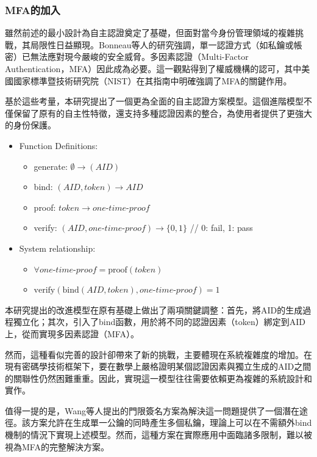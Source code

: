\subsubsection{MFA的加入}
雖然前述的最小設計為自主認證奠定了基礎，但面對當今身份管理領域的複雜挑戰，其局限性日益顯現。Bonneau等人\cite{bonneau2012mfa}的研究強調，單一認證方式（如私鑰或帳密）已無法應對現今嚴峻的安全威脅。多因素認證（Multi-Factor Authentication，MFA）因此成為必要。這一觀點得到了權威機構的認可，其中美國國家標準暨技術研究院（NIST）在其指南中明確強調了MFA的關鍵作用\cite{NIST800-63-3}。

基於這些考量，本研究提出了一個更為全面的自主認證方案模型。這個進階模型不僅保留了原有的自主性特徵，還支持多種認證因素的整合，為使用者提供了更強大的身份保護。
\begin{itemize}
  \item Function Definitions:
        \begin{itemize}
          \item generate: $\emptyset \rightarrow (AID)$
          \item bind: $(AID, token) \rightarrow AID$
          \item proof: $token \rightarrow one\text{-}time\text{-}proof$
          \item verify: $(AID, one\text{-}time\text{-}proof) \rightarrow \{0,1\}$ \hfill // 0: fail, 1: pass
        \end{itemize}
  \item System relationship:
        \begin{itemize}
          \item $\forall one\text{-}time\text{-}proof = \text{proof}(token)$
          \item $\text{verify}(\text{bind}(AID, token), one\text{-}time\text{-}proof) = 1$
        \end{itemize}
\end{itemize}
本研究提出的改進模型在原有基礎上做出了兩項關鍵調整：首先，將AID的生成過程獨立化；其次，引入了bind函數，用於將不同的認證因素（token）綁定到AID上，從而實現多因素認證（MFA）。

然而，這種看似完善的設計卻帶來了新的挑戰，主要體現在系統複雜度的增加。在現有密碼學技術框架下，要在數學上嚴格證明某個認證因素與獨立生成的AID之間的關聯性仍然困難重重。因此，實現這一模型往往需要依賴更為複雜的系統設計和實作。

值得一提的是，Wang等人\cite{Wang2013ThresholdSignatureSchemes}提出的門限簽名方案為解決這一問題提供了一個潛在途徑。該方案允許在生成單一公鑰的同時產生多個私鑰，理論上可以在不需額外bind機制的情況下實現上述模型。然而，這種方案在實際應用中面臨諸多限制，難以被視為MFA的完整解決方案。
